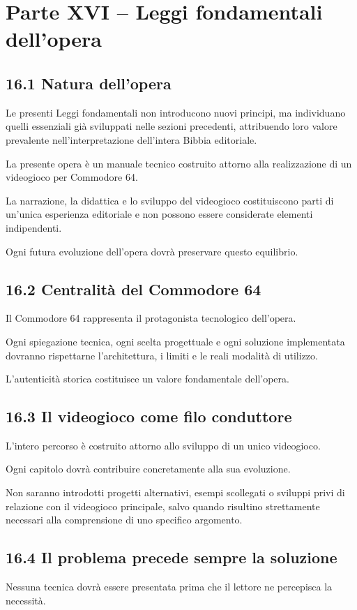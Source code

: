 \documentclass{article}
\begin{document}
\section[Parte XVI – Leggi fondamentali dell{}'opera]{Parte XVI – Leggi fondamentali dell'opera}
\subsection[16.1 Natura dell{}'opera]{16.1 Natura dell'opera}
Le presenti Leggi fondamentali non introducono nuovi principi, ma individuano quelli essenziali già sviluppati nelle
sezioni precedenti, attribuendo loro valore prevalente nell'interpretazione dell'intera Bibbia editoriale.

La presente opera è un manuale tecnico costruito attorno alla realizzazione di un videogioco per Commodore 64.

La narrazione, la didattica e lo sviluppo del videogioco costituiscono parti di un'unica esperienza editoriale e non
possono essere considerate elementi indipendenti.

Ogni futura evoluzione dell'opera dovrà preservare questo equilibrio.

\subsection{16.2 Centralità del Commodore 64}
Il Commodore 64 rappresenta il protagonista tecnologico dell'opera.

Ogni spiegazione tecnica, ogni scelta progettuale e ogni soluzione implementata dovranno rispettarne l'architettura, i
limiti e le reali modalità di utilizzo.

L'autenticità storica costituisce un valore fondamentale dell'opera.

\subsection{16.3 Il videogioco come filo conduttore}
L'intero percorso è costruito attorno allo sviluppo di un unico videogioco.

Ogni capitolo dovrà contribuire concretamente alla sua evoluzione.

Non saranno introdotti progetti alternativi, esempi scollegati o sviluppi privi di relazione con il videogioco
principale, salvo quando risultino strettamente necessari alla comprensione di uno specifico argomento.

\subsection{16.4 Il problema precede sempre la soluzione}
Nessuna tecnica dovrà essere presentata prima che il lettore ne percepisca la necessità.
\end{document}
